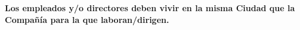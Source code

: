 \textbf{Los empleados y/o directores deben vivir en la misma Ciudad que la Compañía para la que laboran/dirigen.}\vspace{.3cm}
